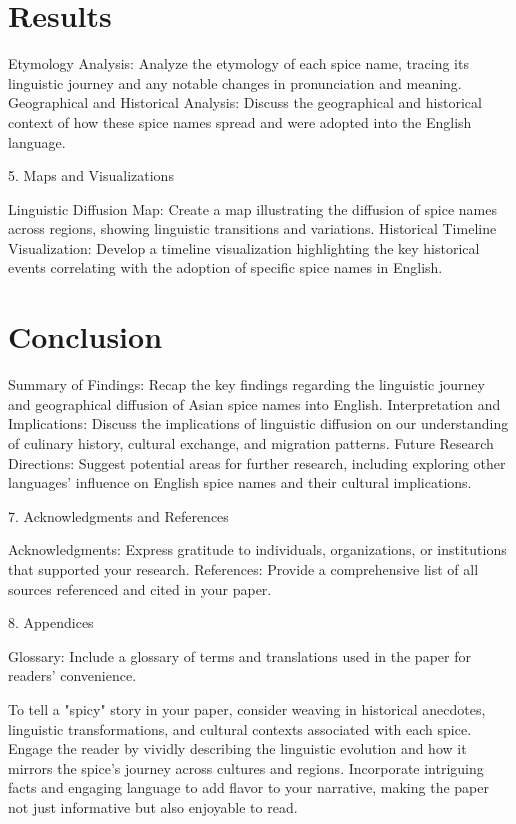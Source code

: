 \documentclass{dsh} %
\begin{document}
\section{Results}

Etymology Analysis: Analyze the etymology of each spice name, tracing its linguistic journey and any notable changes in pronunciation and meaning.
Geographical and Historical Analysis: Discuss the geographical and historical context of how these spice names spread and were adopted into the English language.

5. Maps and Visualizations

Linguistic Diffusion Map: Create a map illustrating the diffusion of spice names across regions, showing linguistic transitions and variations.
Historical Timeline Visualization: Develop a timeline visualization highlighting the key historical events correlating with the adoption of specific spice names in English.

\section{Conclusion}

Summary of Findings: Recap the key findings regarding the linguistic journey and geographical diffusion of Asian spice names into English.
Interpretation and Implications: Discuss the implications of linguistic diffusion on our understanding of culinary history, cultural exchange, and migration patterns.
Future Research Directions: Suggest potential areas for further research, including exploring other languages' influence on English spice names and their cultural implications.

7. Acknowledgments and References

Acknowledgments: Express gratitude to individuals, organizations, or institutions that supported your research.
References: Provide a comprehensive list of all sources referenced and cited in your paper.

8. Appendices

Glossary: Include a glossary of terms and translations used in the paper for readers' convenience.

To tell a "spicy" story in your paper, consider weaving in historical anecdotes, linguistic transformations, and cultural contexts associated with each spice. Engage the reader by vividly describing the linguistic evolution and how it mirrors the spice's journey across cultures and regions. Incorporate intriguing facts and engaging language to add flavor to your narrative, making the paper not just informative but also enjoyable to read.



\printbibliography

\theendnotes
\end{document}
